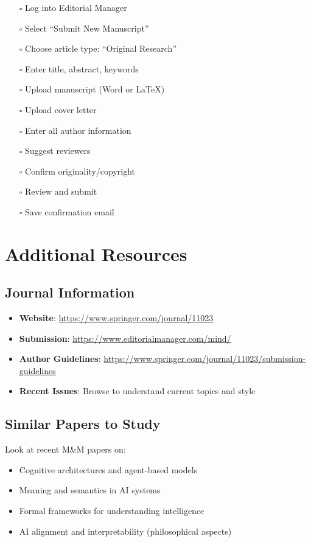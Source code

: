 \documentclass[12pt]{article}
\begin{document}
\begin{enumerate}[leftmargin=*]
\item[$\square$] Log into Editorial Manager
\item[$\square$] Select ``Submit New Manuscript''
\item[$\square$] Choose article type: ``Original Research''
\item[$\square$] Enter title, abstract, keywords
\item[$\square$] Upload manuscript (Word or LaTeX)
\item[$\square$] Upload cover letter
\item[$\square$] Enter all author information
\item[$\square$] Suggest reviewers
\item[$\square$] Confirm originality/copyright
\item[$\square$] Review and submit
\item[$\square$] Save confirmation email
\end{enumerate}

\section{Additional Resources}

\subsection{Journal Information}

\begin{itemize}[leftmargin=*]
\item \textbf{Website}: \url{https://www.springer.com/journal/11023}
\item \textbf{Submission}: \url{https://www.editorialmanager.com/mind/}
\item \textbf{Author Guidelines}: \url{https://www.springer.com/journal/11023/submission-guidelines}
\item \textbf{Recent Issues}: Browse to understand current topics and style
\end{itemize}

\subsection{Similar Papers to Study}

Look at recent M\&M papers on:
\begin{itemize}[leftmargin=*]
\item Cognitive architectures and agent-based models
\item Meaning and semantics in AI systems
\item Formal frameworks for understanding intelligence
\item AI alignment and interpretability (philosophical aspects)
\end{itemize}
\end{document}
